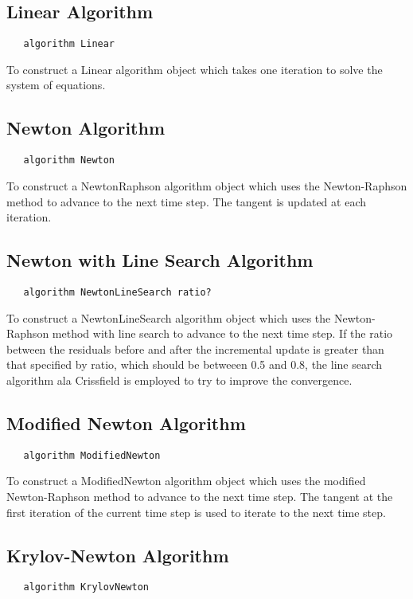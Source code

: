 \documentclass[12pt]{article}
\begin{document}
\subsection {Linear Algorithm}
{\sf\small
\begin{verbatim}
   algorithm Linear
\end{verbatim}
}

To construct a Linear algorithm object which takes one iteration to solve
the system of equations.

\subsection {Newton Algorithm}
{\sf\small
\begin{verbatim}
   algorithm Newton
\end{verbatim}
}

To construct a NewtonRaphson algorithm object which uses the Newton-Raphson
method to advance to the next time step. The tangent is updated at
each iteration.


\subsection {Newton with Line Search Algorithm}
{\sf\small
\begin{verbatim}
   algorithm NewtonLineSearch ratio?
\end{verbatim}
}

To construct a NewtonLineSearch algorithm object which uses the Newton-Raphson
method with line search to advance to the next time step. If the
ratio between the residuals before and after the incremental update
is greater than that specified by ratio, which should be betweeen 0.5
and 0.8, the line search algorithm ala Crissfield is employed to try
to improve the convergence. 

\subsection {Modified Newton Algorithm}
{\sf\small
\begin{verbatim}
   algorithm ModifiedNewton
\end{verbatim}
}

To construct a ModifiedNewton algorithm object which uses the modified Newton-Raphson
method to advance to the next time step. The tangent at the first iteration of the current
time step is used to iterate to the next time step.

\subsection {Krylov-Newton Algorithm}
{\sf\small
\begin{verbatim}
   algorithm KrylovNewton
\end{verbatim}
}
\end{document}
